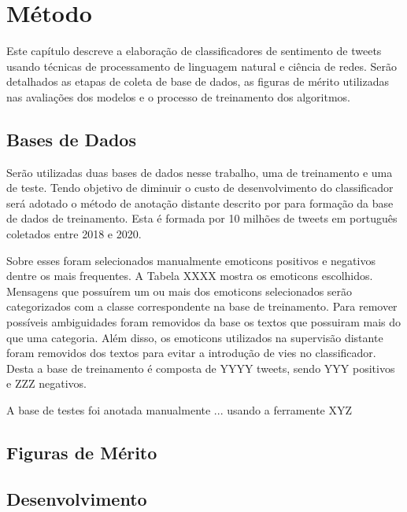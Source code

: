 \chapter{Método}
\label{chapter:method}

Este capítulo descreve a elaboração de classificadores de sentimento de tweets
usando técnicas de processamento de linguagem natural e ciência de redes.
Serão detalhados as etapas de coleta de base de dados, as figuras de mérito
utilizadas nas avaliações dos modelos e o processo de treinamento dos
algoritmos.

\section{Bases de Dados}

Serão utilizadas duas bases de dados nesse trabalho, uma de treinamento e uma de
teste.
Tendo objetivo de diminuir o custo de desenvolvimento do classificador será
adotado o método de anotação distante descrito por \citet{go09} para formação da
base de dados de treinamento.
Esta é formada por 10 milhões de tweets em português coletados entre 2018 e 2020.

Sobre esses foram selecionados manualmente emoticons positivos e negativos
dentre os mais frequentes. A Tabela XXXX mostra os emoticons escolhidos.
Mensagens que possuírem um ou mais dos emoticons selecionados serão
categorizados com a classe correspondente na base de treinamento.
Para remover possíveis ambiguidades foram removidos da base os textos que
possuiram mais do que uma categoria.
Além disso, os emoticons utilizados na supervisão distante foram removidos dos
textos para evitar a introdução de vies no classificador.
Desta a base de treinamento é composta de YYYY tweets, sendo YYY positivos e ZZZ
negativos.

A base de testes foi anotada manualmente ... usando a ferramente XYZ

\section{Figuras de Mérito}


\section{Desenvolvimento}
